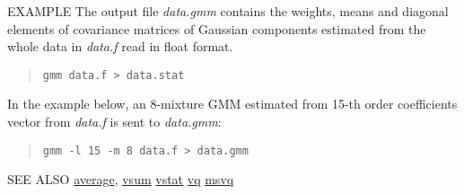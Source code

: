 \begin{qsection}{EXAMPLE}
The output file {\em data.gmm} contains the weights, means and diagonal elements of covariance matrices 
of Gaussian components estimated from the whole data in {\em data.f} read in float format.
\begin{quote}
  \verb!gmm data.f > data.stat!
\end{quote}

In the example below, an 8-mixture GMM estimated from 15-th order coefficients vector from
{\em data.f} is sent to {\em data.gmm}:
\begin{quote}
  \verb!gmm -l 15 -m 8 data.f > data.gmm!
\end{quote}
\end{qsection}

\begin{qsection}{SEE ALSO}
\hyperlink{average}{average},
\hyperlink{vsum}{vsum}
\hyperlink{vstat}{vstat}
\hyperlink{vq}{vq}
\hyperlink{msvq}{msvq}
\end{qsection}
